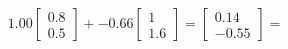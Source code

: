 \documentclass[preview]{standalone}
\begin{document}
\begin{align*}
1.00 \begin{bmatrix} 0.8 \\ 0.5 \end{bmatrix} + -0.66 \begin{bmatrix} 1 \\ 1.6 \end{bmatrix} = \begin{bmatrix} 0.14 \\ -0.55 \end{bmatrix} =
\end{align*}
\end{document}
